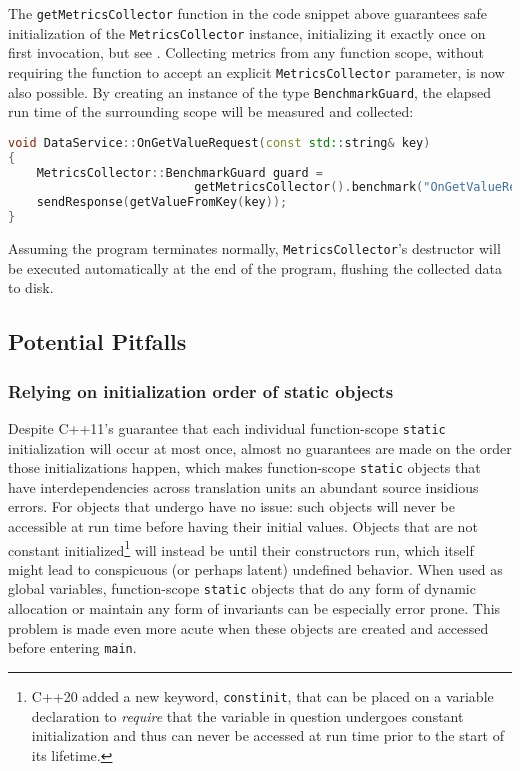 \noindent The \lstinline!getMetricsCollector! function in the code snippet above
guarantees safe initialization of the \lstinline!MetricsCollector!
instance, initializing it exactly once on first invocation, but see .
Collecting metrics from any function scope, without requiring the
function to accept an explicit \lstinline!MetricsCollector! parameter, is
now also possible. By creating an instance of the  type
\lstinline!BenchmarkGuard!, the elapsed run time of the surrounding scope
will be measured and collected:

\begin{lstlisting}[language=C++]
void DataService::OnGetValueRequest(const std::string& key)
{
    MetricsCollector::BenchmarkGuard guard =
                          getMetricsCollector().benchmark("OnGetValueRequest");
    sendResponse(getValueFromKey(key));
}
\end{lstlisting}
    
\noindent Assuming the program terminates normally, \lstinline!MetricsCollector!'s
destructor will be executed automatically at the end of the program,
flushing the collected data to disk.

\subsection[Potential Pitfalls]{Potential Pitfalls}\label{potential-pitfalls-functionstatic}

\subsubsection[Relying on initialization order of \tt{static} objects]{Relying on initialization order of {\ParaCode static} objects}\label{relying-on-initialization-order-of-static-objects}

Despite C++11's guarantee that each individual function-scope
\lstinline!static! initialization will occur at most once, almost no
guarantees are made on the order those initializations happen, which
makes function-scope \lstinline!static! objects that have interdependencies
across translation units an abundant source insidious errors. For
objects that undergo  have no issue:
such objects will never be accessible at run time before having their
initial values. Objects that are not constant
initialized{\cprotect\footnote{C++20 added a new keyword,
\lstinline!constinit!, that can be placed on a variable declaration to
\emph{require} that the variable in question undergoes constant
initialization and thus can never be accessed at run time prior to the
  start of its lifetime.}} will instead be 
until their constructors run, which itself might lead to conspicuous (or
perhaps latent) undefined behavior. When used as global variables,
function-scope \lstinline!static! objects that do any form of dynamic
allocation or maintain any form of invariants can be especially error
prone. This problem is made even more acute when these objects are
created and accessed before entering \lstinline!main!.

